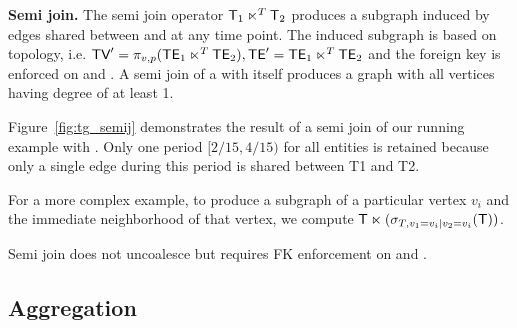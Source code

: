 
{\bf Semi join.}  The semi join operator $\mathsf{T}_1 \ltimes^T \mathsf{T}_2$
produces a subgraph induced by edges shared between  and
 at any time point.  The induced subgraph is based on
topology, i.e. $\textsf{TV}' = \pi_{v,p} ( \textsf{TE}_1 \ltimes^T \textsf{TE}_2), \textsf{TE}' =
\textsf{TE}_1 \ltimes^T \textsf{TE}_2$ and the foreign key is enforced on \tav and
\tae.  A semi join of a \ttt with itself produces a graph with all
vertices having degree of at least 1.

Figure~\ref{fig:tg_semij} demonstrates the result of a semi join of
our running example  with .  Only one period
$[2/15, 4/15)$ for all entities is retained because only a single edge
  during this period is shared between T1 and T2.

For a more complex example, to produce a subgraph of a particular
vertex $v_i$ and the immediate neighborhood of that vertex, we compute
$\mathsf{T} \ltimes (\sigma_{T,v_1=v_i | v_2=v_i} (\mathsf{T}))$.

Semi join does not uncoalesce but requires FK enforcement on \tav and
\tae.

\subsection{Aggregation}
\label{sec:algebra:agg}

